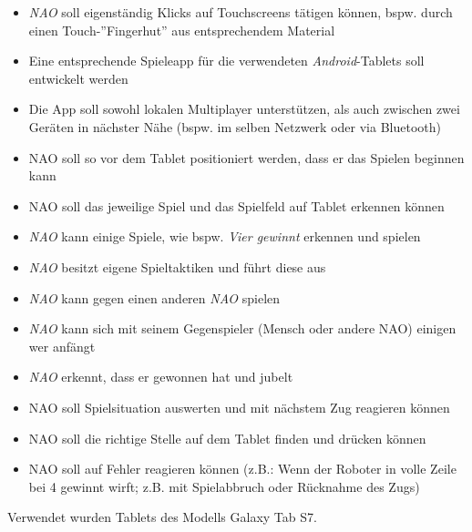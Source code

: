 \begin{itemize}
    \item \textit{NAO} soll eigenständig Klicks auf Touchscreens tätigen können, bspw. durch einen Touch-”Fingerhut” aus entsprechendem Material
\item Eine entsprechende Spieleapp für die verwendeten \textit{Android}-Tablets soll entwickelt werden
\item Die App soll sowohl lokalen Multiplayer unterstützen, als auch zwischen zwei Geräten in nächster Nähe (bspw. im selben Netzwerk oder via Bluetooth)
\item NAO soll so vor dem Tablet positioniert werden, dass er das Spielen beginnen kann
\item NAO soll das jeweilige Spiel und das Spielfeld auf Tablet erkennen können
\item \textit{NAO} kann einige Spiele, wie bspw. \textit{Vier gewinnt} erkennen und spielen
\item \textit{NAO} besitzt eigene Spieltaktiken und führt diese aus
\item \textit{NAO} kann gegen einen anderen \textit{NAO} spielen
\item \textit{NAO} kann sich mit seinem Gegenspieler (Mensch oder andere NAO) einigen wer anfängt 
\item \textit{NAO} erkennt, dass er gewonnen hat und jubelt
\item NAO soll Spielsituation auswerten und mit nächstem Zug reagieren können
\item NAO soll die richtige Stelle auf dem Tablet finden und drücken können
\item NAO soll auf Fehler reagieren können  (z.B.: Wenn der Roboter in volle Zeile bei 4 gewinnt wirft; z.B. mit Spielabbruch oder Rücknahme des Zugs)
\end{itemize}

Verwendet wurden Tablets des Modells Galaxy Tab S7.